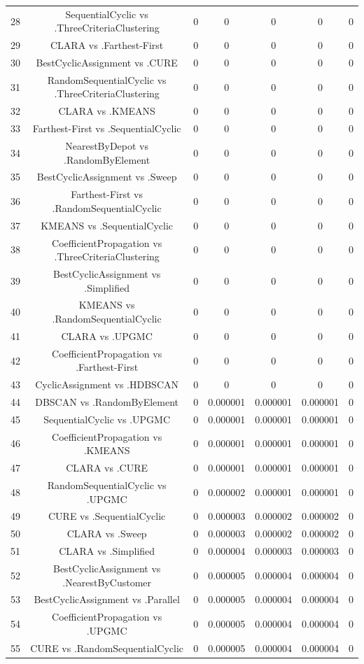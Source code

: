 \documentclass[a4paper,10pt]{article}
\begin{document}
\begin{landscape}
\begin{table}[!htp]
\begin{tabular}{ccccccc}
28&SequentialCyclic vs .ThreeCriteriaClustering&0&0&0&0&0\\
29&CLARA vs .Farthest-First&0&0&0&0&0\\
30&BestCyclicAssignment vs .CURE&0&0&0&0&0\\
31&RandomSequentialCyclic vs .ThreeCriteriaClustering&0&0&0&0&0\\
32&CLARA vs .KMEANS&0&0&0&0&0\\
33&Farthest-First vs .SequentialCyclic&0&0&0&0&0\\
34&NearestByDepot vs .RandomByElement&0&0&0&0&0\\
35&BestCyclicAssignment vs .Sweep&0&0&0&0&0\\
36&Farthest-First vs .RandomSequentialCyclic&0&0&0&0&0\\
37&KMEANS vs .SequentialCyclic&0&0&0&0&0\\
38&CoefficientPropagation vs .ThreeCriteriaClustering&0&0&0&0&0\\
39&BestCyclicAssignment vs .Simplified&0&0&0&0&0\\
40&KMEANS vs .RandomSequentialCyclic&0&0&0&0&0\\
41&CLARA vs .UPGMC&0&0&0&0&0\\
42&CoefficientPropagation vs .Farthest-First&0&0&0&0&0\\
43&CyclicAssignment vs .HDBSCAN&0&0&0&0&0\\
44&DBSCAN vs .RandomByElement&0&0.000001&0.000001&0.000001&0\\
45&SequentialCyclic vs .UPGMC&0&0.000001&0.000001&0.000001&0\\
46&CoefficientPropagation vs .KMEANS&0&0.000001&0.000001&0.000001&0\\
47&CLARA vs .CURE&0&0.000001&0.000001&0.000001&0\\
48&RandomSequentialCyclic vs .UPGMC&0&0.000002&0.000001&0.000001&0\\
49&CURE vs .SequentialCyclic&0&0.000003&0.000002&0.000002&0\\
50&CLARA vs .Sweep&0&0.000003&0.000002&0.000002&0\\
51&CLARA vs .Simplified&0&0.000004&0.000003&0.000003&0\\
52&BestCyclicAssignment vs .NearestByCustomer&0&0.000005&0.000004&0.000004&0\\
53&BestCyclicAssignment vs .Parallel&0&0.000005&0.000004&0.000004&0\\
54&CoefficientPropagation vs .UPGMC&0&0.000005&0.000004&0.000004&0\\
55&CURE vs .RandomSequentialCyclic&0&0.000005&0.000004&0.000004&0\\

\end{tabular}
\end{table}
\end{landscape}
\end{document}
